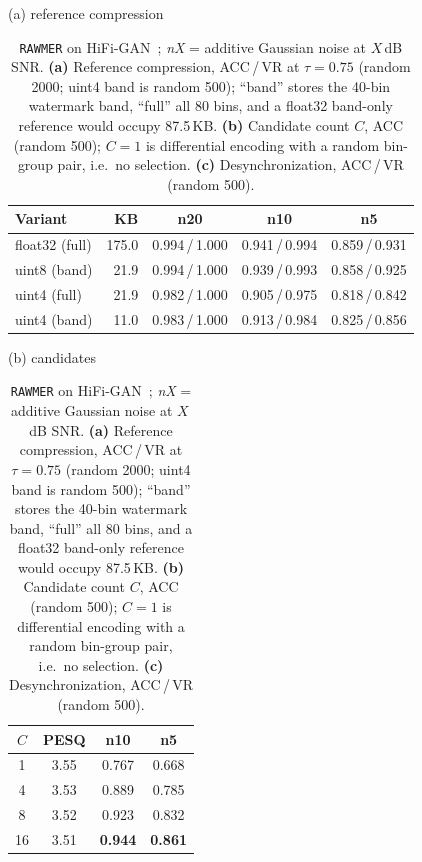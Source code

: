 \begin{table}[t]
\centering
\footnotesize
\caption{\texttt{RAWMER} on HiFi-GAN~\cite{kong2020}; \emph{nX} = additive Gaussian
noise at $X$\,dB SNR. \textbf{(a)} Reference compression, ACC\,/\,VR at
$\tau\!=\!0.75$ (random 2000; uint4 band is random 500); ``band'' stores the 40-bin
watermark band, ``full'' all 80 bins, and a float32 band-only reference would occupy
87.5\,KB. \textbf{(b)} Candidate count $C$, ACC (random 500); $C\!=\!1$ is
differential encoding with a random bin-group pair, i.e.\ no selection.
\textbf{(c)} Desynchronization, ACC\,/\,VR (random 500).}
\label{tab:compress}
\vspace{2pt}
\renewcommand{\arraystretch}{1.0}
\begin{minipage}[t]{0.45\linewidth}
\centering
{\footnotesize (a) reference compression\par}\vspace{2pt}
\setlength{\tabcolsep}{3pt}
\begin{tabular}{@{}l r c c c@{}}
\toprule
Variant & KB & n20 & n10 & n5 \\
\midrule
float32 (full) & 175.0 & 0.994\,/\,1.000 & 0.941\,/\,0.994 & 0.859\,/\,0.931 \\
uint8 (band) & 21.9  & 0.994\,/\,1.000 & 0.939\,/\,0.993 & 0.858\,/\,0.925 \\
uint4 (full) & 21.9  & 0.982\,/\,1.000 & 0.905\,/\,0.975 & 0.818\,/\,0.842 \\
uint4 (band) & 11.0  & 0.983\,/\,1.000 & 0.913\,/\,0.984 & 0.825\,/\,0.856 \\
\bottomrule
\end{tabular}
\end{minipage}\hfill
\begin{minipage}[t]{0.155\linewidth}
\centering
{\footnotesize (b) candidates\par}\vspace{2pt}
\setlength{\tabcolsep}{3pt}
\begin{tabular}{@{}c c c c@{}}
\toprule
$C$ & PESQ & n10 & n5 \\
\midrule
1  & 3.55 & 0.767 & 0.668 \\
4  & 3.53 & 0.889 & 0.785 \\
8  & 3.52 & 0.923 & 0.832 \\
16 & 3.51 & \textbf{0.944} & \textbf{0.861} \\
\bottomrule
\end{tabular}
\end{minipage}\hfill
\begin{minipage}[t]{0.35\linewidth}

\end{minipage}
\end{table}
